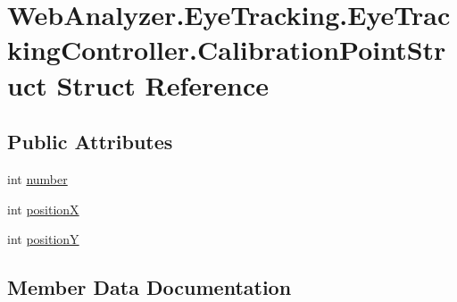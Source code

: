 \hypertarget{struct_web_analyzer_1_1_eye_tracking_1_1_eye_tracking_controller_1_1_calibration_point_struct}{}\section{Web\+Analyzer.\+Eye\+Tracking.\+Eye\+Tracking\+Controller.\+Calibration\+Point\+Struct Struct Reference}
\label{struct_web_analyzer_1_1_eye_tracking_1_1_eye_tracking_controller_1_1_calibration_point_struct}
\subsection*{Public Attributes}
\begin{DoxyCompactItemize}
\item 
int \hyperlink{struct_web_analyzer_1_1_eye_tracking_1_1_eye_tracking_controller_1_1_calibration_point_struct_a25103a5b9edcc8a34d9e8a50603f42a7}{number}
\item 
int \hyperlink{struct_web_analyzer_1_1_eye_tracking_1_1_eye_tracking_controller_1_1_calibration_point_struct_ab5839017e5cf4f0903b65489ce851e30}{position\+X}
\item 
int \hyperlink{struct_web_analyzer_1_1_eye_tracking_1_1_eye_tracking_controller_1_1_calibration_point_struct_a81012e692ca9acc6731f971810dabc89}{position\+Y}
\end{DoxyCompactItemize}


\subsection{Member Data Documentation}
\hypertarget{struct_web_analyzer_1_1_eye_tracking_1_1_eye_tracking_controller_1_1_calibration_point_struct_a25103a5b9edcc8a34d9e8a50603f42a7}{}
